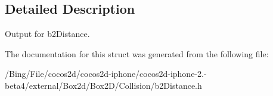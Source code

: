 \subsection{Detailed Description}
Output for b2\-Distance. 

The documentation for this struct was generated from the following file\-:\begin{DoxyCompactItemize}
\item 
/\-Bing/\-File/cocos2d/cocos2d-\/iphone/cocos2d-\/iphone-\/2.-\/beta4/external/\-Box2d/\-Box2\-D/\-Collision/b2\-Distance.\-h\end{DoxyCompactItemize}
